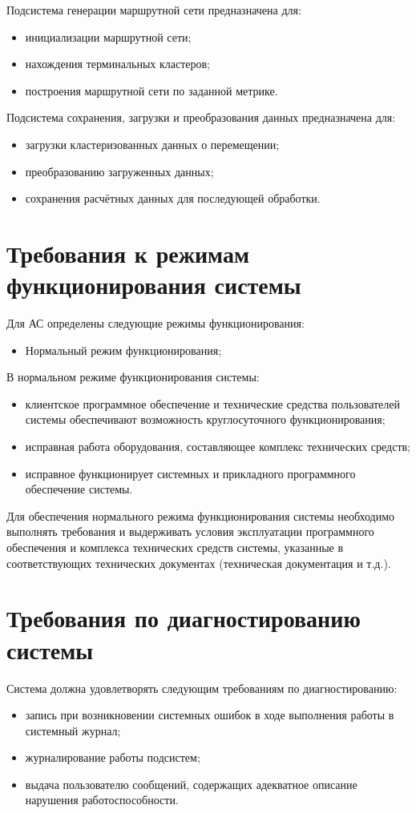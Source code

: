 Подсистема генерации маршрутной сети предназначена для:
\begin{itemize}
    \item инициализации маршрутной сети;
    \item нахождения терминальных кластеров;
    \item построения маршрутной сети по заданной метрике.
\end{itemize}

Подсистема сохранения, загрузки и преобразования данных предназначена для:
\begin{itemize}
    \item загрузки кластеризованных данных о перемещении;
    \item преобразованию загруженных данных;
    \item сохранения расчётных данных для последующей обработки.
\end{itemize}

\section{Требования к режимам функционирования системы}
Для АС определены следующие режимы функционирования:
\begin{itemize}
    \item Нормальный режим функционирования;
\end{itemize}
В нормальном режиме функционирования системы:
\begin{itemize}
    \item клиентское программное обеспечение и технические средства пользователей системы 
        обеспечивают возможность круглосуточного функционирования;
    \item исправная работа оборудования, составляющее комплекс технических средств;
    \item исправное функционирует системных и прикладного программного обеспечение системы.
\end{itemize}
Для обеспечения нормального режима функционирования системы необходимо выполнять требования и 
выдерживать условия эксплуатации программного обеспечения и комплекса технических средств системы, 
указанные в соответствующих технических документах (техническая документация и т.д.).

\section{Требования по диагностированию системы}
Система должна удовлетворять следующим требованиям по диагностированию:
\begin{itemize}
    \item запись при возникновении системных ошибок в ходе выполнения работы в системный журнал;
    \item журналирование работы подсистем;
    \item выдача пользователю сообщений, содержащих адекватное описание нарушения 
        работоспособности.
\end{itemize}

